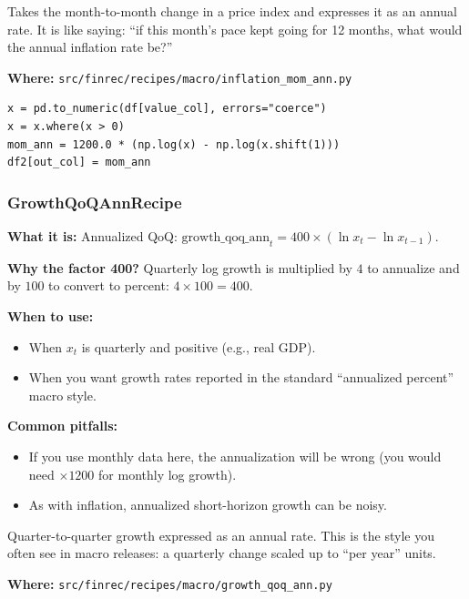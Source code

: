 \documentclass[11pt,a4paper]{article}
\begin{document}
\begin{intuitionbox}
Takes the month-to-month change in a price index and expresses it as an annual rate. It is like saying: ``if this month’s pace kept going for 12 months, what would the annual inflation rate be?''
\end{intuitionbox}

\textbf{Where:} \texttt{src/finrec/recipes/macro/inflation\_mom\_ann.py}

\begin{lstlisting}
x = pd.to_numeric(df[value_col], errors="coerce")
x = x.where(x > 0)
mom_ann = 1200.0 * (np.log(x) - np.log(x.shift(1)))
df2[out_col] = mom_ann
\end{lstlisting}

\subsubsection{GrowthQoQAnnRecipe}\label{sec:growth-qoq}

\textbf{What it is:} Annualized QoQ: $\text{growth\_qoq\_ann}_t = 400 \times (\ln x_t - \ln x_{t-1})$.

\textbf{Why the factor 400?} Quarterly log growth is multiplied by \(4\) to annualize and by \(100\) to convert to percent: \(4 \times 100 = 400\).

\textbf{When to use:}
\begin{itemize}[leftmargin=2em]
  \item When \(x_t\) is quarterly and positive (e.g., real GDP).
  \item When you want growth rates reported in the standard ``annualized percent'' macro style.
\end{itemize}

\textbf{Common pitfalls:}
\begin{itemize}[leftmargin=2em]
  \item If you use monthly data here, the annualization will be wrong (you would need \(\times 1200\) for monthly log growth).
  \item As with inflation, annualized short-horizon growth can be noisy.
\end{itemize}

\begin{intuitionbox}
Quarter-to-quarter growth expressed as an annual rate. This is the style you often see in macro releases: a quarterly change scaled up to ``per year'' units.
\end{intuitionbox}

\textbf{Where:} \texttt{src/finrec/recipes/macro/growth\_qoq\_ann.py}
\end{document}
